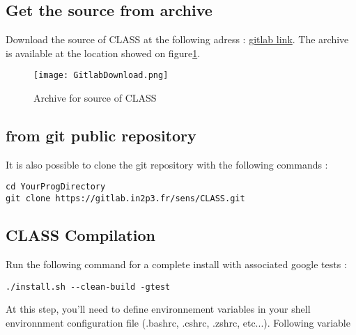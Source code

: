 \subsection{Get the source from archive}

Download the source of CLASS at the following adress : \href{https://gitlab.in2p3.fr/sens/CLASS/tree/master}{gitlab link}. The archive is available at the location showed on figure\ref{fig:CLASSArchive}.

    \begin{figure}[H]
    \centering
    \centerline{\texttt{[image: GitlabDownload.png]}}
    \caption{Archive for source of CLASS}
    \label{fig:CLASSArchive}
    \end{figure}

\subsection{from git public repository}

It is also possible to clone the git repository with the following commands : 

\begin{center}
\begin{minipage}{\textwidth}
\begin{lstlisting}[style=terminal]
cd YourProgDirectory
git clone https://gitlab.in2p3.fr/sens/CLASS.git
\end{lstlisting}
\end{minipage}
\end{center}

\subsection{CLASS Compilation}

Run the following command for a complete install with associated google tests : 

\begin{center}
\begin{minipage}{\textwidth}
\begin{lstlisting}[style=terminal]
./install.sh --clean-build -gtest
\end{lstlisting}
\end{minipage}
\end{center}

At this step, you'll need to define environnement variables in your shell environnment configuration file (.bashrc, .cshrc, .zshrc, etc...). Following variable 


